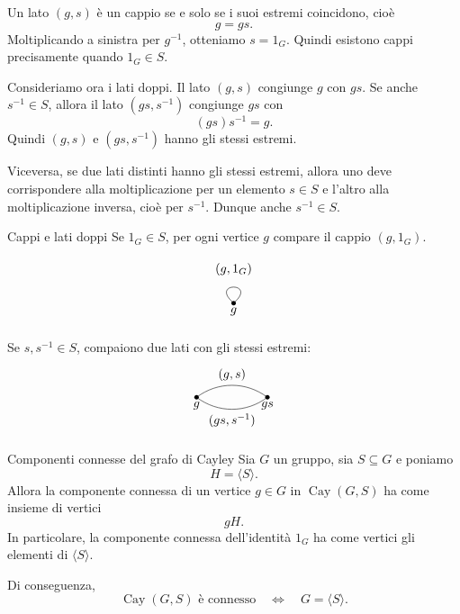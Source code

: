 \documentclass[a4paper]{article}
\begin{document}
\begin{snippetproof}{}
    Un lato \((g,s)\) è un cappio se e solo se i suoi estremi coincidono, cioè
    \[
        g=gs.
    \]
    Moltiplicando a sinistra per \(g^{-1}\), otteniamo \(s=1_G\). Quindi esistono cappi precisamente quando \(1_G\in S\).

    Consideriamo ora i lati doppi. Il lato \((g,s)\) congiunge \(g\) con \(gs\). Se anche \(s^{-1}\in S\), allora il lato \((gs,s^{-1})\) congiunge \(gs\) con
    \[
        (gs)s^{-1}=g.
    \]
    Quindi \((g,s)\) e \((gs,s^{-1})\) hanno gli stessi estremi.

    Viceversa, se due lati distinti hanno gli stessi estremi, allora uno deve corrispondere alla moltiplicazione per un elemento \(s\in S\) e l'altro alla moltiplicazione inversa, cioè per \(s^{-1}\). Dunque anche \(s^{-1}\in S\).
\end{snippetproof}

\begin{snippetexample}{Cappi e lati doppi}
    Se \(1_G\in S\), per ogni vertice \(g\) compare il cappio \((g,1_G)\).

    \[
        \begin{tikzpicture}[scale=1]
            \coordinate (g) at (0,0);
            \fill (g) circle (1.8pt);
            \node[below] at (g) {\(g\)};
            \draw (g) .. controls +(-0.7,0.6) and +(0.7,0.6) .. (g);
            \node[above] at (0,0.65) {\((g,1_G)\)};
        \end{tikzpicture}
    \]

    Se \(s,s^{-1}\in S\), compaiono due lati con gli stessi estremi:
    \[
        \begin{tikzpicture}[scale=1]
            \coordinate (g) at (0,0);
            \coordinate (h) at (2,0);

            \fill (g) circle (1.8pt);
            \fill (h) circle (1.8pt);

            \node[below] at (g) {\(g\)};
            \node[below] at (h) {\(gs\)};

            \draw (g) .. controls +(0.6,0.45) and +(-0.6,0.45) .. node[above] {\((g,s)\)} (h);
            \draw (g) .. controls +(0.6,-0.45) and +(-0.6,-0.45) .. node[below] {\((gs,s^{-1})\)} (h);
        \end{tikzpicture}
    \]
\end{snippetexample}

\begin{snippetproposition}{Componenti connesse del grafo di Cayley}
    Sia \(G\) un gruppo, sia \(S\subseteq G\) e poniamo
    \[
        H=\langle S\rangle.
    \]
    Allora la componente connessa di un vertice \(g\in G\) in \(\operatorname{Cay}(G,S)\) ha come insieme di vertici
    \[
        gH.
    \]
    In particolare, la componente connessa dell'identità \(1_G\) ha come vertici gli elementi di \(\langle S\rangle\).

    Di conseguenza,
    \[
        \operatorname{Cay}(G,S) \text{ è connesso}
        \quad\Longleftrightarrow\quad
        G=\langle S\rangle.
    \]
\end{snippetproposition}
\end{document}
